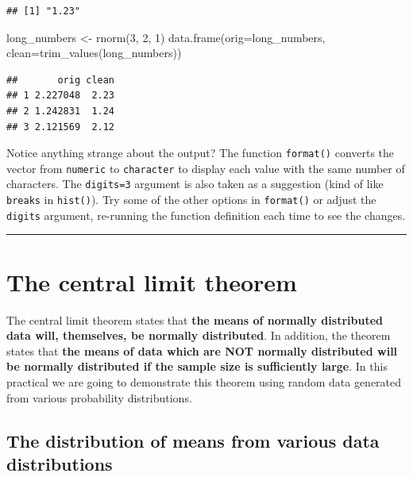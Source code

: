 \documentclass[
  11pt,
  a4paper,
]{book}
\newenvironment{Shaded}{\begin{snugshade}}{\end{snugshade}}
\newcommand{\AttributeTok}[1]{\textcolor[rgb]{0.77,0.63,0.00}{#1}}
\newcommand{\DecValTok}[1]{\textcolor[rgb]{0.00,0.00,0.81}{#1}}
\newcommand{\FunctionTok}[1]{\textcolor[rgb]{0.00,0.00,0.00}{#1}}
\newcommand{\NormalTok}[1]{#1}
\newcommand{\OtherTok}[1]{\textcolor[rgb]{0.56,0.35,0.01}{#1}}
\begin{document}
\begin{verbatim}
## [1] "1.23"
\end{verbatim}

\begin{Shaded}
\begin{Highlighting}[]
\NormalTok{long\_numbers }\OtherTok{\textless{}{-}} \FunctionTok{rnorm}\NormalTok{(}\DecValTok{3}\NormalTok{, }\DecValTok{2}\NormalTok{, }\DecValTok{1}\NormalTok{)}
\FunctionTok{data.frame}\NormalTok{(}\AttributeTok{orig=}\NormalTok{long\_numbers,}
           \AttributeTok{clean=}\FunctionTok{trim\_values}\NormalTok{(long\_numbers))}
\end{Highlighting}
\end{Shaded}

\begin{verbatim}
##       orig clean
## 1 2.227048  2.23
## 2 1.242831  1.24
## 3 2.121569  2.12
\end{verbatim}

Notice anything strange about the output? The function \texttt{format()} converts the vector from \texttt{numeric} to \texttt{character} to display each value with the same number of characters. The \texttt{digits=3} argument is also taken as a suggestion (kind of like \texttt{breaks} in \texttt{hist()}). Try some of the other options in \texttt{format()} or adjust the \texttt{digits} argument, re-running the function definition each time to see the changes.

\begin{center}\rule{0.5\linewidth}{0.5pt}\end{center}

\hypertarget{the-central-limit-theorem}{%
\section{The central limit theorem}\label{the-central-limit-theorem}}

The central limit theorem states that \textbf{the means of normally distributed data will, themselves, be normally distributed}. In addition, the theorem states that \textbf{the means of data which are NOT normally distributed will be normally distributed if the sample size is sufficiently large}. In this practical we are going to demonstrate this theorem using random data generated from various probability distributions.

\hypertarget{the-distribution-of-means-from-various-data-distributions}{%
\subsection{The distribution of means from various data distributions}\label{the-distribution-of-means-from-various-data-distributions}}
\end{document}

